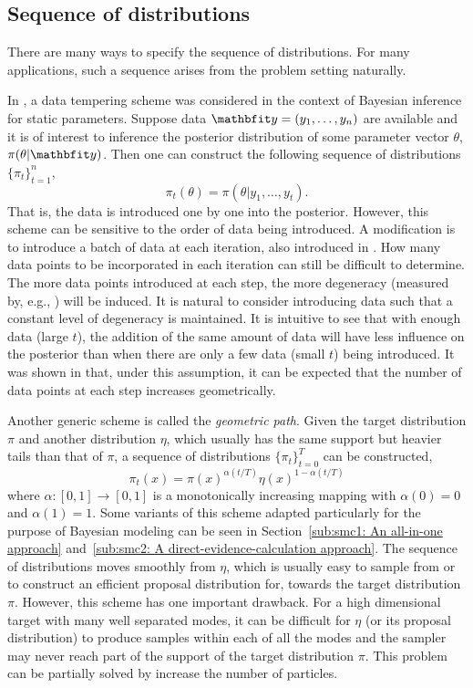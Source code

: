 \subsection{Sequence of distributions}
\label{sub:Sequence of distributions}

There are many ways to specify the sequence of distributions. For many
applications, such a sequence arises from the problem setting naturally.

In \cite{Chopin:2002hg}, a data tempering scheme was considered in the context
of Bayesian inference for static parameters. Suppose data $\data =
(y_1,\dots,y_n)$ are available and it is of interest to inference the
posterior distribution of some parameter vector $\theta$, $\pi(\theta|\data)$.
Then one can construct the following sequence of distributions
$\{\pi_t\}_{t=1}^n$,
\begin{equation}
  \pi_t(\theta) = \pi(\theta|y_1,\dots,y_t).
\end{equation}
That is, the data is introduced one by one into the posterior. However, this
scheme can be sensitive to the order of data being introduced. A modification
is to introduce a batch of data at each iteration, also introduced in
\cite{Chopin:2002hg}. How many data points to be incorporated in each
iteration can still be difficult to determine. The more data points introduced
at each step, the more degeneracy (measured by, e.g., \ess) will be induced.
It is natural to consider introducing data such that a constant level of
degeneracy is maintained. It is intuitive to see that with enough data (large
$t$), the addition of the same amount of data will have less influence on the
posterior than when there are only a few data (small $t$) being introduced.
It was shown in \cite{Chopin:2002hg} that, under this assumption, it can be
expected that the number of data points at each step increases geometrically.

Another generic scheme is called the \emph{geometric path}. Given the target
distribution $\pi$ and another distribution $\eta$, which usually has the same
support but heavier tails than that of $\pi$, a sequence of distributions
$\{\pi_t\}_{t=0}^T$ can be constructed,
\begin{equation}
  \pi_t(x) = \pi(x)^{\alpha(t/T)}\eta(x)^{1-\alpha(t/T)}
\end{equation}
where $\alpha:[0,1]\to[0,1]$ is a monotonically increasing mapping with
$\alpha(0) = 0$ and $\alpha(1) = 1$. Some variants of this scheme adapted
particularly for the purpose of Bayesian modeling can be seen in
Section~\ref{sub:smc1: An all-in-one approach} and~\ref{sub:smc2: A
  direct-evidence-calculation approach}. The sequence of distributions moves
smoothly from $\eta$, which is usually easy to sample from or to construct an
efficient proposal distribution for, towards the target distribution $\pi$.
However, this scheme has one important drawback. For a high dimensional target
with many well separated modes, it can be difficult for $\eta$ (or its
proposal distribution) to produce samples within each of all the modes and the
sampler may never reach part of the support of the target distribution $\pi$.
This problem can be partially solved by increase the number of particles.

